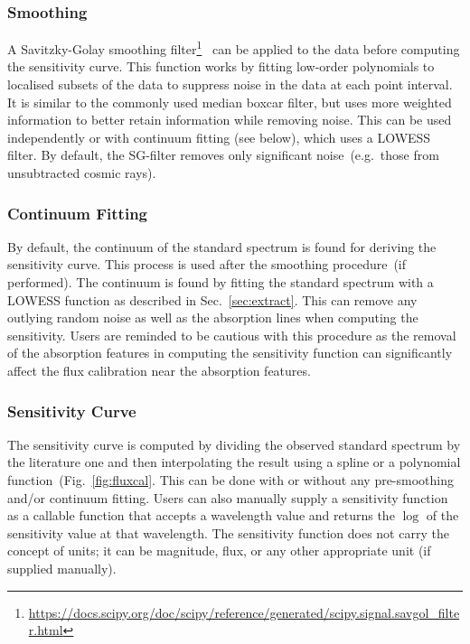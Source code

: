 \documentclass[twocolumn, linenumbers]{aastex631}
\begin{document}
\subsubsection*{Smoothing}
A Savitzky-Golay smoothing
filter\footnote{\url{https://docs.scipy.org/doc/scipy/reference/generated/scipy.signal.savgol_filter.html}}~\citep[hereafter, SG-filter]{1964AnaCh..36.1627S}
can be applied to the data before computing the sensitivity curve.
This function works by fitting low-order polynomials to localised
subsets of the data to suppress noise in the data at each point
interval. It is similar to the commonly used median boxcar filter,
but uses more weighted information to better
retain information while removing noise. This can be
used independently or with continuum fitting (see below), which
uses a LOWESS filter. By default, the SG-filter removes only
significant noise~(e.g.\ those from unsubtracted cosmic rays).

\subsubsection*{Continuum Fitting}
By default, the continuum of the standard spectrum is found for
deriving the sensitivity curve. This process is used after the
smoothing procedure~(if performed). The continuum is found by
fitting the standard spectrum with a LOWESS function as described in
Sec.~\ref{sec:extract}. This can remove any outlying random noise
as well as the absorption lines when computing the sensitivity. Users
are reminded to be cautious with this procedure as the removal of the
absorption features in computing the sensitivity function can
significantly affect the flux calibration near the absorption features.

\subsubsection*{Sensitivity Curve}
The sensitivity curve is computed by dividing the observed standard
spectrum by the literature one and then interpolating the result using a
spline or a polynomial function~(Fig.~\ref{fig:fluxcal}. This can be
done with or without any pre-smoothing and/or continuum fitting. Users
can also manually supply a sensitivity function as a callable function
that accepts a wavelength value and returns the $\log$ of the sensitivity
value at that wavelength. The sensitivity function does not carry the
concept of units; it can be magnitude, flux, or any other appropriate
unit (if supplied manually).
\end{document}
